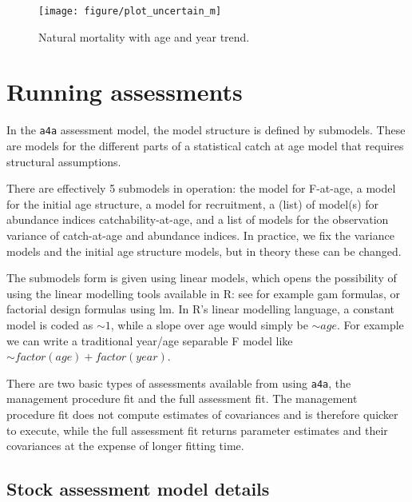\documentclass[a4paper,english,10pt]{article}\usepackage[]{graphicx}\usepackage[]{color}
\newenvironment{knitrout}{}{} %
\newcommand{\code}[1]{{\texttt{#1}}}
\begin{document}
\begin{figure}[h]
\begin{knitrout}
\color{fgcolor}

{\centering \texttt{[image: figure/plot\_uncertain\_m]} 

}



\end{knitrout}

\caption{Natural mortality with age and year trend.}
\label{fig:uncertain_m}
\end{figure}

\pagebreak
\section{Running assessments}


In the \code{a4a} assessment model, the model structure is defined by submodels. These are models for the different parts of a statistical catch at age model that requires structural assumptions.

There are effectively 5 submodels in operation: the model for F-at-age, a model for the initial age structure, a model for recruitment, a (list) of model(s) for abundance indices catchability-at-age, and a list of models for the observation variance of catch-at-age and abundance indices. In practice, we fix the variance models and the initial age structure models, but in theory these can be changed.

The submodels form is given using linear models, which opens the possibility of using the linear modelling tools available in R: see for example gam formulas, or factorial design formulas using lm. In R's linear modelling language, a constant model is coded as $\sim 1$, while a slope over age would simply be $\sim age$. For example we can write a traditional year/age separable F model like $\sim factor(age) + factor(year)$.

There are two basic types of assessments available from using \code{a4a}, the management procedure fit and the full assessment fit. The management procedure fit does not compute estimates of covariances and is therefore quicker to execute, while the full assessment fit returns parameter estimates and their covariances at the expense of longer fitting time.

\subsection{Stock assessment model details}
\end{document}
